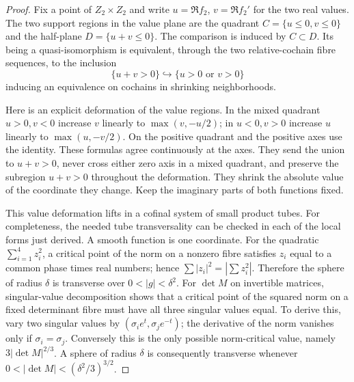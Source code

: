 \begin{proof}
Fix a point of $Z_2\times Z_2$ and write $u=\Re f_2$, $v=\Re f_2'$
for the two real values. The two support regions in the value plane
are the quadrant $C=\{u\le0,v\le0\}$ and the half-plane
$D=\{u+v\le0\}$. The comparison is induced by $C\subset D$.
Its being a quasi-isomorphism is equivalent, through the two
relative-cochain fibre sequences, to the inclusion
\[
   \{u+v>0\}\hookrightarrow\{u>0\text{ or }v>0\}
\]
inducing an equivalence on cochains in shrinking neighborhoods.

Here is an explicit deformation of the value regions. In the mixed
quadrant $u>0,v<0$ increase $v$ linearly to $\max(v,-u/2)$; in
$u<0,v>0$ increase $u$ linearly to $\max(u,-v/2)$.
On the positive quadrant and the positive axes use the identity.
These formulas agree continuously at the axes. They send the union
to $u+v>0$, never cross either zero axis in a mixed quadrant, and
preserve the subregion $u+v>0$ throughout the deformation. They
shrink the absolute value of the coordinate they change. Keep the
imaginary parts of both functions fixed.

This value deformation lifts in a cofinal system of small product
tubes. For completeness, the needed tube transversality can be
checked in each of the local forms just derived. A smooth function
is one coordinate. For the quadratic $\sum_{i=1}^4z_i^2$, a critical
point of the norm on a nonzero fibre satisfies
$z_i$ equal to a common phase times real numbers; hence
$\sum|z_i|^2=|\sum z_i^2|$. Therefore the sphere of radius $\delta$
is transverse over $0<|g|<\delta^2$. For $\det M$ on invertible
matrices, singular-value decomposition shows that a critical point
of the squared norm on a fixed determinant fibre must have all
three singular values equal. To derive this, vary two singular
values by $(\sigma_i e^t,\sigma_j e^{-t})$; the derivative of the
norm vanishes only if $\sigma_i=\sigma_j$. Conversely this is the
only possible norm-critical value, namely $3|\det M|^{2/3}$.
A sphere of radius $\delta$ is consequently transverse whenever
$0<|\det M|<(\delta^2/3)^{3/2}$.


\end{proof}
